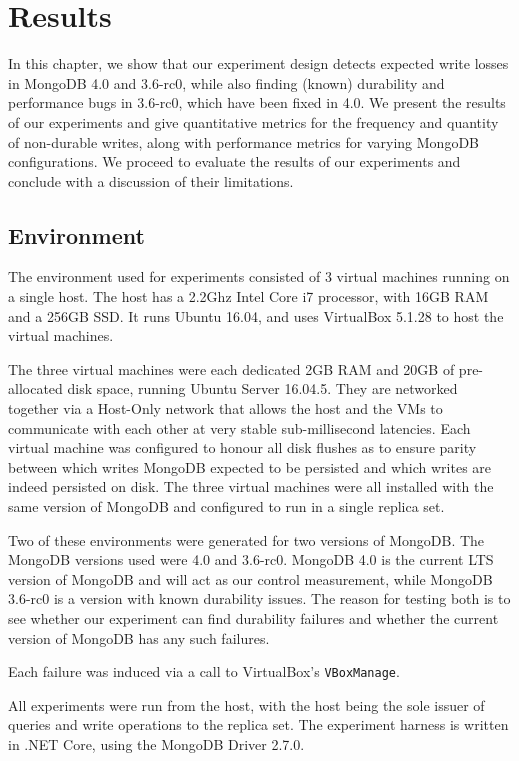 \chapter{Results} \label{chap:det-results}

In this chapter, we show that our experiment design detects expected write losses in MongoDB 4.0 and 3.6-rc0, while also finding (known) durability and performance bugs in 3.6-rc0, which have been fixed in 4.0. We present the results of our experiments and give quantitative metrics for the frequency and quantity of non-durable writes, along with performance metrics for varying MongoDB configurations. We proceed to evaluate the results of our experiments and conclude with a discussion of their limitations.

\section{Environment}

The environment used for experiments consisted of 3 virtual machines running on a single host. The host has a 2.2Ghz Intel Core i7 processor, with 16GB RAM and a 256GB SSD. It runs Ubuntu 16.04, and uses VirtualBox 5.1.28 to host the virtual machines. 

The three virtual machines were each dedicated 2GB RAM and 20GB of pre-allocated disk space, running Ubuntu Server 16.04.5. They are networked together via a Host-Only network that allows the host and the VMs to communicate with each other at very stable sub-millisecond latencies. Each virtual machine was configured to honour all disk flushes as to ensure parity between which writes MongoDB expected to be persisted and which writes are indeed persisted on disk. The three virtual machines were all installed with the same version of MongoDB and configured to run in a single replica set.

Two of these environments were generated for two versions of MongoDB. The MongoDB versions used were 4.0 and 3.6-rc0. MongoDB 4.0 is the current LTS version of MongoDB and will act as our control measurement, while MongoDB 3.6-rc0 is a version with known durability issues. The reason for testing both is to see whether our experiment can find durability failures and whether the current version of MongoDB has any such failures.

Each failure was induced via a call to VirtualBox's \texttt{VBoxManage}.

All experiments were run from the host, with the host being the sole issuer of queries and write operations to the replica set. The experiment harness is written in .NET Core, using the MongoDB Driver 2.7.0.

